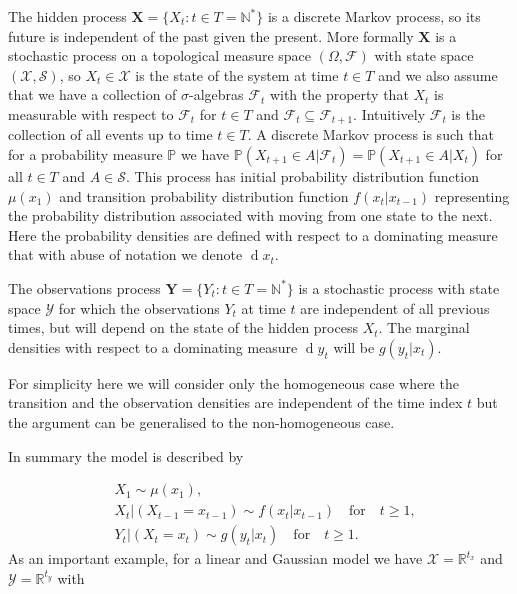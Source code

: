 \documentclass[11pt,a4paper]{article}
\renewcommand{\d}[1]{\ensuremath{\operatorname{d}\!{#1}}}
\renewcommand{\vec}[1]{\mathbf{#1}}
\begin{document}
The hidden process $\vec{X} = \{X_t : t \in T = \mathbb{N}^* \}$ is a discrete Markov process, so its future is independent of the past given the present. More formally $\vec{X}$ is a stochastic process on a topological measure space $(\Omega, \mathcal{F})$ with state space $(\mathcal{X}, \mathcal{S})$, so $X_t \in \mathcal{X}$ is the state of the system at time $t \in T$ and we also assume that we have a collection of $\sigma$-algebras $\mathcal{F}_t$ with the property that $X_t$ is measurable with respect to $\mathcal{F}_t$ for $t \in T$ and $\mathcal{F}_t \subseteq \mathcal{F}_{t+1}$. Intuitively $\mathcal{F}_t$ is the collection of all events up to time $t \in T$. A discrete Markov process is such that for a probability measure $\mathbb{P}$ we have $\mathbb{P}(X_{t+1} \in A | \mathcal{F}_t) = \mathbb{P}(X_{t+1} \in A | X_t)$ for all $t \in T$ and $A \in \mathcal{S}$. This process has initial probability distribution function $\mu(x_1)$ and transition probability distribution function $f(x_t | x_{t-1})$ representing the probability distribution associated with moving from one state to the next. Here the probability densities are defined with respect to a dominating measure that with abuse of notation we denote $\d x_t$. 

The observations process $\vec{Y} = \{Y_t : t \in T = \mathbb{N}^* \}$ is a stochastic process with state space $\mathcal{Y}$ for which the observations $Y_t$ at time $t$ are independent of all previous times, but will depend on the state of the hidden process $X_t$. The marginal densities with respect to a dominating measure $\d y_t$ will be $g(y_t | x_t)$.

For simplicity here we will consider only the homogeneous case where the transition and the observation densities are independent of the time index $t$ but the argument can be generalised to the non-homogeneous case. 

In summary the model is described by

\begin{align}
    & X_1 \sim \mu(x_1), \label{eq:1X_1}\\
    & X_t | (X_{t-1} = x_{t-1}) \sim f(x_t | x_{t-1}) \quad \text{for} \quad t\geq 1, \label{eq:1X_t} \\ 
    & Y_t | (X_t = x_t) \sim g(y_t | x_t) \quad \text{for} \quad t\geq 1. \label{eq:1Y_t}
\end{align}
As an important example, for a linear and Gaussian model we have $\mathcal{X} = \mathbb{R}^{t_x}$ and $\mathcal{Y} = \mathbb{R}^{t_y}$ with
\end{document}
